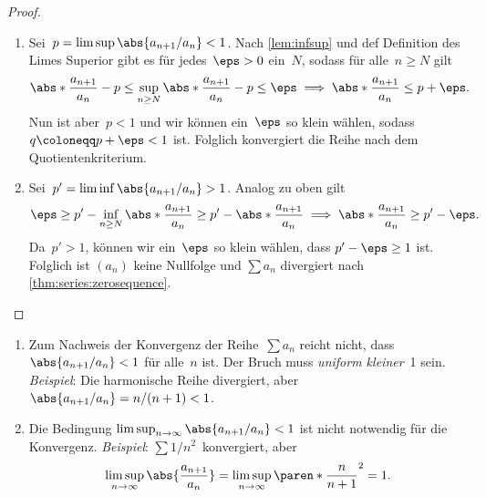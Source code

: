 \documentclass[a4paper]{article}
\begin{document}
\begin{proof}\leavevmode
    \begin{enumerate}
        \item Sei~$p = \limsup \abs{a_{n+1}/a_n} < 1$. Nach \cref{lem:infsup} und def Definition des Limes Superior gibt es für jedes~$\eps > 0$ ein~$N$, sodass für alle~$n \geq N$ gilt
              \begin{equation*}
                  \abs*{\frac{a_{n+1}}{a_n}} - p \leq \sup_{n \geq N}\abs*{\frac{a_{n+1}}{a_n}} - p \leq \eps \implies \abs*{\frac{a_{n+1}}{a_n}} \leq p + \eps.
              \end{equation*}
              Nun ist aber~$p < 1$ und wir können ein~$\eps$ so klein wählen, sodass $q \coloneqq p+\eps  < 1$ ist. Folglich konvergiert die Reihe nach dem Quotientenkriterium.
        \item Sei~$p' = \liminf \abs{a_{n+1}/a_n} > 1$. Analog zu oben gilt
              \begin{equation*}
                  \eps \geq p' - \inf_{n\geq N}\abs*{\frac{a_{n+1}}{a_n}} \geq p' - \abs*{\frac{a_{n+1}}{a_n}} \implies \abs*{\frac{a_{n+1}}{a_n}} \geq p' - \eps.
              \end{equation*}
              Da~$p' > 1$, können wir ein~$\eps$ so klein wählen, dass $p'-\eps \geq 1$ ist. Folglich ist $(a_n)$ keine Nullfolge und $\sum a_n$ divergiert nach \cref{thm:series:zerosequence}.\qedhere
    \end{enumerate}
\end{proof}

\begin{remark}\leavevmode
    \begin{enumerate}
        \item Zum Nachweis der Konvergenz der Reihe~$\sum a_n$ reicht nicht, dass $\abs{a_{n+1}/a_n} < 1$ für alle~$n$ ist. Der Bruch muss \emph{uniform kleiner}~1 sein. \emph{Beispiel}: Die harmonische Reihe divergiert, aber $\abs{a_{n+1}/a_n} = n/(n+1) < 1$.
        \item Die Bedingung $\limsup_{n\to\infty} \abs{a_{n+1}/a_n} < 1$ ist nicht notwendig für die Konvergenz. \emph{Beispiel}: $\sum 1/n^2$~konvergiert, aber
              \begin{equation*}
                  \limsup_{n\to\infty} \abs{\frac{a_{n+1}}{a_n}} = \limsup_{n\to\infty} \paren*{\frac{n}{n+1}}^2 = 1.
              \end{equation*}
    \end{enumerate}
\end{remark}
\end{document}
